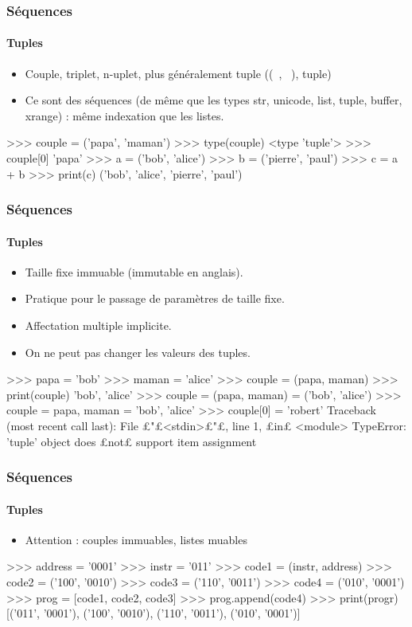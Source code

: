 \begin{frame}[fragile]
\frametitle{Séquences}
\framesubtitle{Tuples}
\begin{itemize}
 \item Couple, triplet, n-uplet, plus généralement tuple ((\ , \ ), tuple)
 \item Ce sont des séquences (de même que les types str, unicode, list, tuple, buffer, xrange) : même indexation que les listes.
\end{itemize}
\begin{pythonConsole}
>>> couple = ('papa', 'maman')
>>> type(couple)
<type 'tuple'>
>>> couple[0]
'papa'
>>> a = ('bob', 'alice')
>>> b = ('pierre', 'paul')
>>> c = a + b
>>> print(c)
('bob', 'alice', 'pierre', 'paul')
\end{pythonConsole}
\end{frame}
\begin{frame}[fragile]
\frametitle{Séquences}
\framesubtitle{Tuples}
\begin{itemize}
 \item Taille fixe immuable (immutable en anglais). 
 \item Pratique pour le passage de paramètres de taille fixe. 
 \item Affectation multiple implicite. 
 \item On ne peut pas changer les valeurs des tuples. 
\end{itemize}
\begin{pythonConsole}
>>> papa = 'bob'
>>> maman = 'alice'
>>> couple = (papa, maman)
>>> print(couple)
'bob', 'alice'
>>> couple = (papa, maman) = ('bob', 'alice')
>>> couple = papa, maman = 'bob', 'alice'
>>> couple[0] = 'robert'
Traceback (most recent call last):
  File £"£<stdin>£"£, line 1, £in£ <module>
TypeError: 'tuple' object does £not£ support item assignment
\end{pythonConsole}
\end{frame}
\begin{frame}[fragile]
\frametitle{Séquences}
\framesubtitle{Tuples}
\begin{itemize}
 \item Attention : couples immuables, listes muables 
\end{itemize}
\begin{pythonConsole}
>>> address = '0001'
>>> instr = '011'
>>> code1 = (instr, address)
>>> code2 = ('100', '0010')
>>> code3 = ('110', '0011')
>>> code4 = ('010', '0001')
>>> prog = [code1, code2, code3]
>>> prog.append(code4)
>>> print(progr)
[('011', '0001'), ('100', '0010'), ('110', '0011'), ('010', '0001')]
\end{pythonConsole}
\end{frame}
